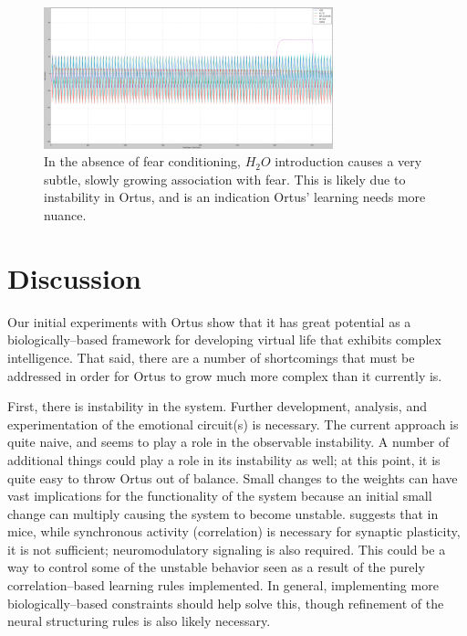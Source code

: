 \documentclass[letterpaper]{article}
\begin{document}
\begin{figure}
\begin{center}
\includegraphics[width=3.3in]{images/no_conditioning_small.png}
\caption{In the absence of fear conditioning, $H_2O$ introduction causes a very subtle, slowly growing association with fear. This is likely due to instability in Ortus, and is an indication Ortus' learning needs more nuance.}
\label{no_conditioning}
\end{center}
\end{figure}






\section{Discussion}


Our initial experiments with Ortus show that it has great potential as a biologically--based framework for developing virtual life that exhibits complex intelligence. That said, there are a number of shortcomings that must be addressed in order for Ortus to grow much more complex than it currently is.

First, there is instability in the system. Further development, analysis, and experimentation of the emotional circuit(s) is necessary. The current approach is quite naive, and seems to play a role in the observable instability. A number of additional things could play a role in its instability as well; at this point, it is quite easy to throw Ortus out of balance. Small changes to the weights can have vast implications for the functionality of the system because an initial small change can multiply causing the system to become unstable. \citet{Johansen2014} suggests that in mice, while synchronous activity (correlation) is necessary for synaptic plasticity, it is not sufficient; neuromodulatory signaling is also required. This could be a way to control some of the unstable behavior seen as a result of the purely correlation--based learning rules implemented. In general, implementing more biologically--based constraints should help solve this, though refinement of the neural structuring rules is also likely necessary.
\end{document}
